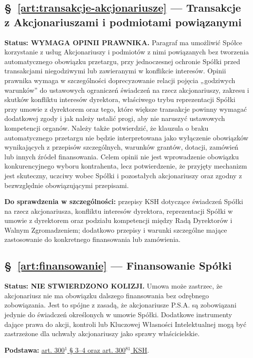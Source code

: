 \documentclass[12pt,a4paper]{report}
\begin{document}
\subsection*{§~\ref{art:transakcje-akcjonariusze} — Transakcje z Akcjonariuszami i podmiotami powiązanymi}
\textbf{Status: WYMAGA OPINII PRAWNIKA.} Paragraf ma umożliwić Spółce korzystanie z usług Akcjonariuszy i podmiotów z nimi powiązanych bez tworzenia automatycznego obowiązku przetargu, przy jednoczesnej ochronie Spółki przed transakcjami niegodziwymi lub zawieranymi w konflikcie interesów. Opinii prawnika wymaga w szczególności doprecyzowanie relacji pojęcia „godziwych warunków” do ustawowych ograniczeń świadczeń na rzecz akcjonariuszy, zakresu i skutków konfliktu interesów dyrektora, właściwego trybu reprezentacji Spółki przy umowie z dyrektorem oraz tego, które większe transakcje powinny wymagać dodatkowej zgody i jak należy ustalić progi, aby nie naruszyć ustawowych kompetencji organów. Należy także potwierdzić, że klauzula o braku automatycznego przetargu nie będzie interpretowana jako wyłączenie obowiązków wynikających z przepisów szczególnych, warunków grantów, dotacji, zamówień lub innych źródeł finansowania. Celem opinii nie jest wprowadzenie obowiązku konkurencyjnego wyboru kontrahenta, lecz potwierdzenie, że przyjęty mechanizm jest skuteczny, uczciwy wobec Spółki i pozostałych akcjonariuszy oraz zgodny z bezwzględnie obowiązującymi przepisami.

\textbf{Do sprawdzenia w szczególności:} przepisy KSH dotyczące świadczeń Spółki na rzecz akcjonariusza, konfliktu interesów dyrektora, reprezentacji Spółki w umowie z dyrektorem oraz podziału kompetencji między Radą Dyrektorów i Walnym Zgromadzeniem; dodatkowo przepisy i warunki szczególne mające zastosowanie do konkretnego finansowania lub zamówienia.

\subsection*{§~\ref{art:finansowanie} — Finansowanie Spółki}
\textbf{Status: NIE STWIERDZONO KOLIZJI.} Umowa może zastrzec, że akcjonariusz nie ma obowiązku dalszego finansowania bez odrębnego zobowiązania. Jest to spójne z zasadą, że akcjonariusze P.S.A. są zobowiązani jedynie do świadczeń określonych w umowie Spółki. Dodatkowe instrumenty dające prawa do akcji, kontroli lub Kluczowej Własności Intelektualnej mogą być zastrzeżone dla uchwały akcjonariuszy jako sprawy właścicielskie.

\textbf{Podstawa:} \href{https://eli.gov.pl/api/acts/DU/2024/18/text.html}{art. 300$^{1}$ § 3--4 oraz art. 300$^{81}$ KSH}.
\end{document}
